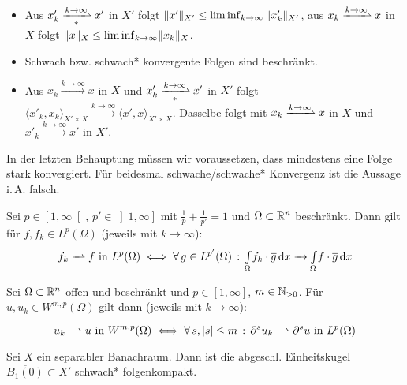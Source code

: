 \documentclass{cheat-sheet}
\newcommand{\IntO}[2]{\Int{\Omega}{}{#1}{#2}} %
\newcommand{\convWith}[1]{\xrightarrow{#1 \to \infty}} %
\newcommand{\convWeaklyWith}[1]{\xrightharpoonup{#1 \to \infty}} %
\newcommand{\convWeaklyStarWith}[1]{\xrightharpoonup[*]{#1 \to \infty}} %
\begin{document}
\begin{lem}
  \begin{itemize}
    \item Aus $x'_k \convWeaklyStarWith{k} x'$ in $X'$ folgt $\lVert x'\rVert_{X'} \leq \liminf_{k \to \infty} \|x'_k\|_{X'}$, aus $x_k \convWeaklyWith{k} x$ in $X$ folgt $\|x\|_X \leq \liminf_{k \to \infty} \lVert x_k\rVert_X$.
    \item Schwach bzw. schwach* konvergente Folgen sind beschränkt.
    \item Aus $x_k \convWith{k} x$ in $X$ und $x'_k \convWeaklyStarWith{k} x'$ in $X'$ folgt $\langle x'_k, x_k \rangle_{X' \times X} \convWith{k} \langle x', x \rangle_{X' \times X}$. Dasselbe folgt mit $x_k \convWeaklyWith{k} x$ in $X$ und $x'_k \convWith{k} x'$ in $X'$.
  \end{itemize}
\end{lem}

\begin{acht}
  In der letzten Behauptung müssen wir voraussetzen, dass mindestens eine Folge stark konvergiert. Für beidesmal schwache/schwache* Konvergenz ist die Aussage i.\,A. falsch.
\end{acht}

\begin{bsp}
  Sei $p \in \left[ 1, \infty \right[$, $p' \in \left] 1, \infty \right]$ mit $\tfrac{1}{p} + \tfrac{1}{p'} = 1$ und $\Omega \subset \mathbb{R}^n$ beschränkt. Dann gilt für $f, f_k \in L^p(\Omega)$ (jeweils mit $k {\to} \infty$):
  \[ f_k \xrightharpoonup{\phantom{A}} f \text{ in } L^p(\Omega) \iff \fa{g \in L^{p'}(\Omega)} \IntO{f_k \cdot \overline{g}}{x} \xrightarrow{\phantom{A}} \IntO{f \cdot \overline{g}}{x} \]
\end{bsp}

\begin{bsp}
  Sei $\Omega \subset \mathbb{R}^n$ offen und beschränkt und $p \in \left[ 1, \infty \right]$, $m \in \mathbb{N}_{> 0}$. Für $u, u_k \in W^{m,p}(\Omega)$ gilt dann (jeweils mit $k {\to} \infty$):
  \[ u_k \xrightharpoonup{\phantom{A}} u \text{ in } W^{m,p}(\Omega) \iff \fa{s, \abs{s} \leq m} \partial^s u_k \xrightharpoonup{\phantom{A}} \partial^s u \text{ in } L^p(\Omega) \]
\end{bsp}

\begin{satz}
  Sei $X$ ein separabler Banachraum. Dann ist die abgeschl. Einheitskugel $\overline{B_1(0)} \subset X'$ schwach* folgenkompakt.
\end{satz}
\end{document}
